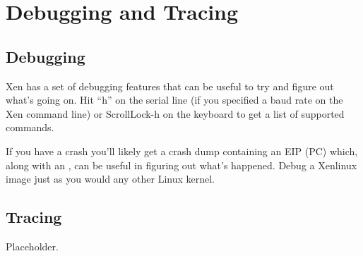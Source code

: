 \chapter{Debugging and Tracing}

\section{Debugging}
\label{s:keys}

Xen has a set of debugging features that can be useful to try and figure
out what's going on. Hit ``h'' on the serial line (if you specified a baud
rate on the Xen command line) or ScrollLock-h on the keyboard to get a
list of supported commands.

If you have a crash you'll likely get a crash dump containing an EIP
(PC) which, along with an , can be useful in
figuring out what's happened. Debug a Xenlinux image just as you would
any other Linux kernel.


\section{Tracing}

Placeholder.